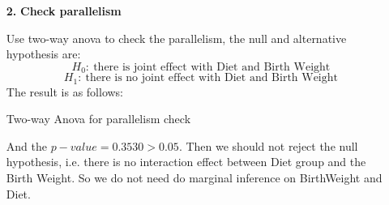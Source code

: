 \documentclass[10pt,letterpaper]{article}
\begin{document}
\begin{enumerate}[leftmargin=0cm,itemindent=.5cm,labelwidth=\itemindent,labelsep=0cm,align=left]
\begin{enumerate}[leftmargin=0cm,itemindent=.5cm,labelwidth=\itemindent,labelsep=0cm,align=left]
\item[\textbf{2.}] \textbf{Check parallelism}

Use two-way anova to check the parallelism,  the null and alternative hypothesis are:
\[H_0: \ \text{there is joint effect with Diet and Birth Weight}\]
\[H_1: \ \text{there is no joint effect with Diet and Birth Weight}\]
The result is as follows:
\begin{center}
Two-way Anova for parallelism check

\end{center}
And the $p-value = 0.3530>0.05$. Then we should not reject the null hypothesis, i.e. there is no interaction effect between Diet group and the Birth Weight. So we do not need do marginal inference on BirthWeight and Diet. 
\end{enumerate}
\end{enumerate}
\end{document}
